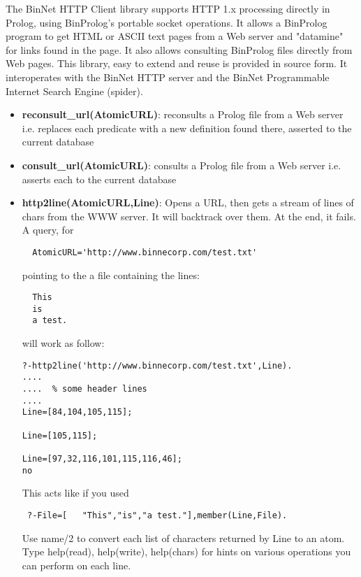 \documentclass{article}
\begin{document}
 The BinNet HTTP Client library supports HTTP 1.x processing
 directly in Prolog, using BinProlog's portable socket operations.
 It allows a BinProlog program to get HTML or ASCII text pages
 from a Web server and "datamine" for links found in the page. 
 It also allows consulting BinProlog files directly from Web pages.
 This library, easy to extend and reuse is provided in source form.
 It interoperates with the BinNet HTTP server and the BinNet Programmable 
 Internet Search Engine (spider).


\begin{itemize}
\item {\bf reconsult\_url(AtomicURL)}:
  reconsults a Prolog file from a Web server i.e. replaces each
  predicate with a new definition found there, asserted to the current
  database

\item {\bf consult\_url(AtomicURL)}:
  consults a Prolog file from a Web server i.e. asserts each
  to the current database


\item {\bf http2line(AtomicURL,Line)}: Opens a URL, then gets a stream of lines
  of chars from the WWW server. It will backtrack over them. At the end,
  it fails. A query, for
\begin{verbatim}
  AtomicURL='http://www.binnecorp.com/test.txt'
\end{verbatim}

pointing to the a file containing the lines:

\begin{verbatim}
  This
  is
  a test.
\end{verbatim}

will work as follow:

\begin{verbatim}
?-http2line('http://www.binnecorp.com/test.txt',Line).
....
....  % some header lines
....
Line=[84,104,105,115];

Line=[105,115];

Line=[97,32,116,101,115,116,46];
no
\end{verbatim}

This acts like if you used 

\begin{verbatim}
 ?-File=[   "This","is","a test."],member(Line,File).
\end{verbatim}

Use name/2 to convert each list of characters returned by Line
to an atom. Type help(read), help(write), help(chars) for
hints on various operations you can perform on each line.


\end{itemize}
\end{document}
